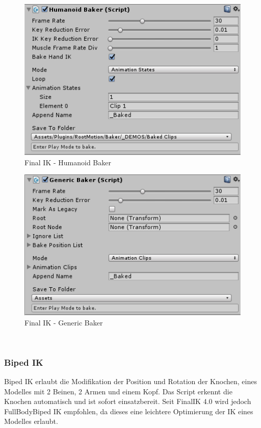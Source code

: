 \begin{itemize}
\begin {figure}
    \centering
    \includegraphics[scale=1]{pics/finalik_baker_HumanoidBakerComponent}
    \caption{Final IK - Humanoid Baker}
    \label{fig:finalIK_humanoid_baker}
\end {figure}
\begin {figure}
    \centering
    \includegraphics[scale=1]{pics/finalik_baker_GenericBakerComponent}
    \caption{Final IK - Generic Baker}
    \label{fig:finalIK_generic_baker}
\end {figure}
~\cite{FinalIK_Baker_2021}

\subsubsection{Biped IK}
Biped IK erlaubt die Modifikation der Position und Rotation der Knochen, eines Modelles mit 2 Beinen, 2 Armen und einem Kopf.
Das Script erkennt die Knochen automatisch und ist sofort einsatzbereit.
Seit FinalIK 4.0 wird jedoch FullBodyBiped IK empfohlen, da dieses eine leichtere Optimierung der IK eines Modelles erlaubt.


\end{itemize}
